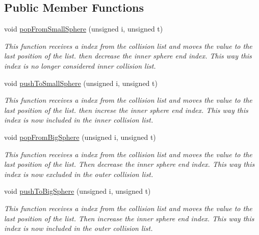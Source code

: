 \subsection*{Public Member Functions}
\begin{DoxyCompactItemize}
\item 
void \hyperlink{class_p_l_y_collision_sphere_adc8f318a913935cdd31d81f1c96192eb}{pop\+From\+Small\+Sphere} (unsigned i, unsigned t)
\begin{DoxyCompactList}\small\item\em This function receives a index from the collision list and moves the value to the last position of the list. then decrease the inner sphere end index. This way this index is no longer considered inner collision list. \end{DoxyCompactList}\item 
void \hyperlink{class_p_l_y_collision_sphere_a546ea2c6fe80908502fba0350c4f9726}{push\+To\+Small\+Sphere} (unsigned i, unsigned t)
\begin{DoxyCompactList}\small\item\em This function receives a index from the collision list and moves the value to the last position of the list. then increse the inner sphere end index. This way this index is now included in the inner collision list. \end{DoxyCompactList}\item 
\mbox{\label{class_p_l_y_collision_sphere_ac9cf3838088310db3dc8f0d282c3c383}} 
void \hyperlink{class_p_l_y_collision_sphere_ac9cf3838088310db3dc8f0d282c3c383}{pop\+From\+Big\+Sphere} (unsigned i, unsigned t)
\begin{DoxyCompactList}\small\item\em This function receives a index from the collision list and moves the value to the last position of the list. Then decrease the inner sphere end index. This way this index is now excluded in the outer collision list. \end{DoxyCompactList}\item 
\mbox{\label{class_p_l_y_collision_sphere_aa1fe5971687051f0de78a12ee4b31574}} 
void \hyperlink{class_p_l_y_collision_sphere_aa1fe5971687051f0de78a12ee4b31574}{push\+To\+Big\+Sphere} (unsigned i, unsigned t)
\begin{DoxyCompactList}\small\item\em This function receives a index from the collision list and moves the value to the last position of the list. Then increase the inner sphere end index. This way this index is now included in the outer collision list. \end{DoxyCompactList}\item 

\end{DoxyCompactItemize}
